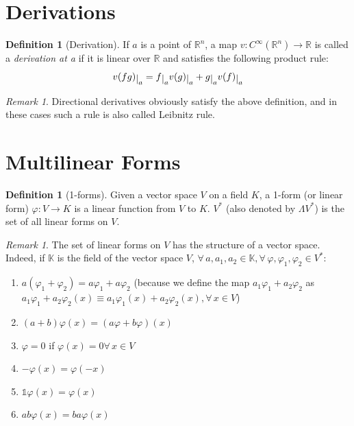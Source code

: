 \documentclass[a4paper,11pt,titlepage]{article}
\numberwithin{equation}{section}
\theoremstyle{definition}
\newtheorem{definition}[theorem]{Definition}
\theoremstyle{remark}
\newtheorem{remark}[theorem]{Remark}
\newcommand{\rfield}{\mathbb{R}}
\newcommand{\restrict}[2]{{#1}\raisebox{-.5ex}{$|$}_{#2}}
\begin{document}
\section{Derivations}
\begin{definition}[Derivation] \label{derivation}
If $a$ is a point of $\rfield^n$, a map $v \colon C^{\infty}(\rfield^n) \rightarrow \rfield$ is called a \textit{derivation at a} if it is linear over $\rfield$ and satisfies the following product rule:
$$\restrict{v(fg)}{a} = \restrict{f}{a} \restrict{v(g)}{a} + \restrict{g}{a} \restrict{v(f)}{a}$$
\end{definition}

\begin{remark}
Directional derivatives obviously satisfy the above definition, and in these cases such a rule is also called Leibnitz rule.
\end{remark}

\newpage
\section{Multilinear Forms}

\begin{definition}[1-forms]
Given a  vector space $V$ on a field $K$, a 1-form (or linear form) $\varphi \colon V \rightarrow K$ is a linear function from $V$ to $K$. $V^*$ (also denoted by $\Lambda V^*$) is the set of all linear forms on $V$.
\end{definition}

\begin{remark}
  The set of linear forms on $V$ has the structure of a vector space. Indeed, if $\mathbb{K}$ is the field of the vector space $V$, $\forall\, a, a_1, a_2 \in \mathbb{K}, \forall\, \varphi, \varphi_1, \varphi_2 \in V^*$:
  \begin{enumerate}
    \item $a(\varphi_1 + \varphi_2) = a \varphi_1 + a\varphi_2$ (because we define the map $a_1\varphi_1 + a_2\varphi_2$ as $a_1\varphi_1 + a_2\varphi_2 (x) \equiv a_1 \varphi_1(x) + a_2 \varphi_2(x), \forall\, x \in V$)
    \item $(a+b)\varphi(x) = (a\varphi + b \varphi)(x)$
    \item $\varphi=0$ if $\varphi(x) = 0 \forall\, x \in V$
    \item $-\varphi(x) = \varphi(-x)$
    \item $\mathbb{1}\varphi(x) = \varphi(x)$
    \item $ab\varphi(x) = ba \varphi(x)$
  \end{enumerate}
\end{remark}
\end{document}
